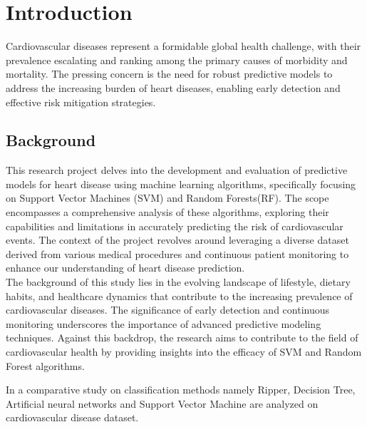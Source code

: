 \chapter{Introduction}
\label{ch:into} %

Cardiovascular diseases represent a formidable global health challenge, with their prevalence 
escalating and ranking among the primary causes of morbidity and mortality. The pressing 
concern is the need for robust predictive models to address the increasing burden of heart 
diseases, enabling early detection and effective risk mitigation strategies.
\\


  

\section{Background}
\label{sec:into_back}

This research project delves into the development and 
evaluation of predictive models for heart disease using machine learning algorithms, 
specifically focusing on Support Vector Machines (SVM) and Random Forests(RF). The scope encompasses 
a comprehensive analysis of these algorithms, exploring their capabilities and limitations in 
accurately predicting the risk of cardiovascular events. The context of the project revolves 
around leveraging a diverse dataset derived from various medical procedures and continuous 
patient monitoring to enhance our understanding of heart disease prediction.
\\

The background of this study lies in the evolving landscape of lifestyle, dietary habits, and 
healthcare dynamics that contribute to the increasing prevalence of cardiovascular diseases. 
The significance of early detection and continuous monitoring underscores the importance of 
advanced \cite{toma2023predictive}predictive modeling techniques. Against this backdrop, the research aims to contribute 
to the field of cardiovascular health by providing insights into the efficacy of SVM and Random 
Forest algorithms.

In \cite{kumari2023comparative}  a comparative study on classification methods namely
Ripper, Decision Tree, Artificial neural networks and Support
Vector Machine are analyzed on cardiovascular disease
dataset.

